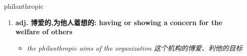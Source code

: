 
\begin{frame}
{\huge philanthropic}
\begin{center}
\begin{enumerate}\Large
  \item \textbf{adj. 博爱的,为他人着想的: having or showing a concern for the welfare of others}
  \begin{itemize}
    \item \em{\Large{the philanthropic aims of the organization 这个机构的博爱、利他的目标}}
  \end{itemize}
\end{enumerate}
\end{center}
\end{frame}
